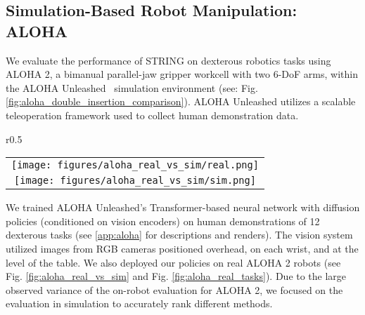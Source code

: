 \vspace{-2mm}
\subsection{Simulation-Based Robot Manipulation: ALOHA}
\label{sec:aloha}
We evaluate the performance of STRING on dexterous robotics tasks using ALOHA 2, a bimanual parallel-jaw gripper workcell with two 6-DoF arms, within the ALOHA Unleashed~\citep{zhao2024aloha} simulation environment (see: Fig.  \ref{fig:aloha_double_insertion_comparison}).
ALOHA Unleashed utilizes a scalable teleoperation framework used to collect human demonstration data.

\begin{wrapfigure}{r}{0.5\textwidth}
  \begin{center} \vspace{-13mm}
\setlength\tabcolsep{2pt}%
\begin{tabular}{c}
\texttt{[image: figures/aloha\_real\_vs\_sim/real.png]} \\
\texttt{[image: figures/aloha\_real\_vs\_sim/sim.png]}
\end{tabular}
 \vspace{-13mm}
\label{fig:aloha_real_vs_sim}
  \end{center}
\end{wrapfigure}
We trained ALOHA Unleashed's Transformer-based neural network with diffusion policies (conditioned on vision encoders) on human demonstrations of 12 dexterous tasks (see \cref{app:aloha} for descriptions and renders).
The vision system utilized images from RGB cameras positioned overhead, on each wrist, and at the level of the table.
We also deployed our policies on real ALOHA 2 robots (see Fig. \ref{fig:aloha_real_vs_sim} and Fig. \ref{fig:aloha_real_tasks}). Due to the large observed variance of the on-robot evaluation for ALOHA 2, we focused on the evaluation in simulation to accurately rank different methods.

